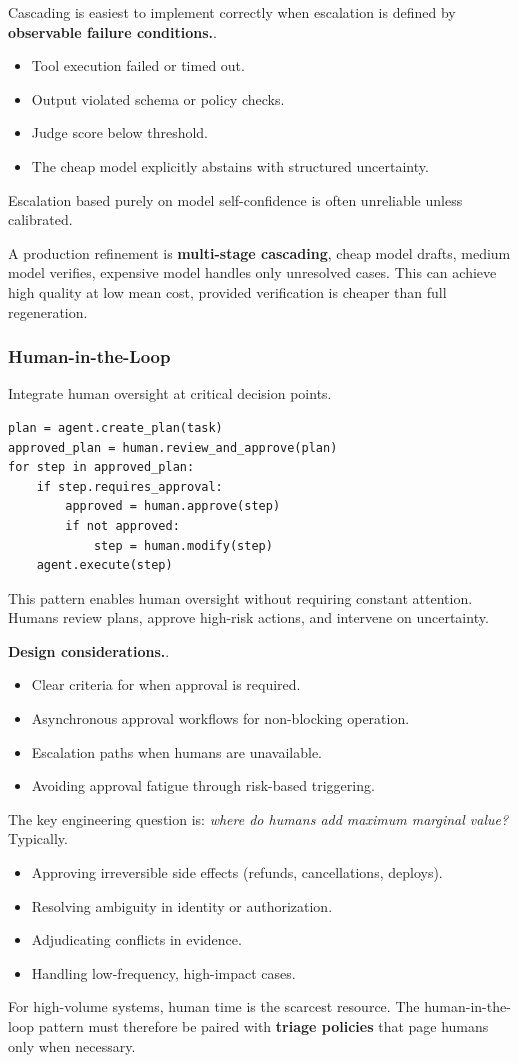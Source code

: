 Cascading is easiest to implement correctly when escalation is defined by \textbf{observable failure conditions.}.
\begin{itemize}
\item Tool execution failed or timed out.
\item Output violated schema or policy checks.
\item Judge score below threshold.
\item The cheap model explicitly abstains with structured uncertainty.
\end{itemize}
Escalation based purely on model self-confidence is often unreliable unless calibrated.

A production refinement is \textbf{multi-stage cascading}, cheap model drafts, medium model verifies, expensive model handles only unresolved cases. This can achieve high quality at low mean cost, provided verification is cheaper than full regeneration.

\subsubsection{Human-in-the-Loop}

Integrate human oversight at critical decision points.

\begin{verbatim}
plan = agent.create_plan(task)
approved_plan = human.review_and_approve(plan)
for step in approved_plan:
    if step.requires_approval:
        approved = human.approve(step)
        if not approved:
            step = human.modify(step)
    agent.execute(step)
\end{verbatim}

This pattern enables human oversight without requiring constant attention. Humans review plans, approve high-risk actions, and intervene on uncertainty.

\textbf{Design considerations.}.
\begin{itemize}
\item Clear criteria for when approval is required.
\item Asynchronous approval workflows for non-blocking operation.
\item Escalation paths when humans are unavailable.
\item Avoiding approval fatigue through risk-based triggering.
\end{itemize}

The key engineering question is: \textit{where do humans add maximum marginal value?} Typically.
\begin{itemize}
\item Approving irreversible side effects (refunds, cancellations, deploys).
\item Resolving ambiguity in identity or authorization.
\item Adjudicating conflicts in evidence.
\item Handling low-frequency, high-impact cases.
\end{itemize}
For high-volume systems, human time is the scarcest resource. The human-in-the-loop pattern must therefore be paired with \textbf{triage policies} that page humans only when necessary.

